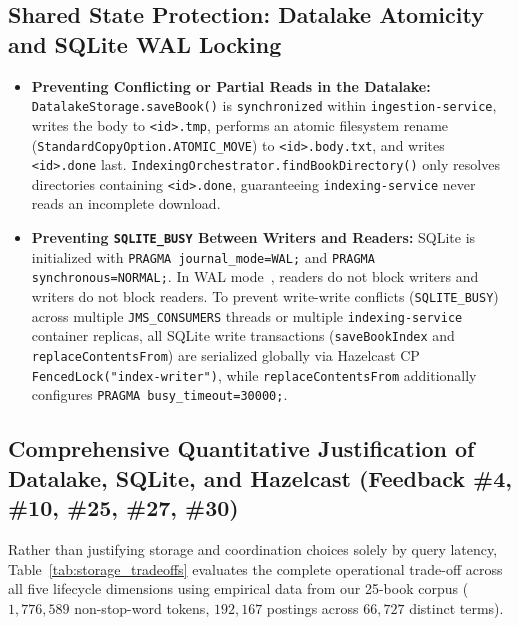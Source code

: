 \documentclass[10pt,a4paper]{article}
\begin{document}
\subsection{Shared State Protection: Datalake Atomicity and SQLite WAL Locking}
\begin{itemize}[leftmargin=*,nosep]
    \item \textbf{Preventing Conflicting or Partial Reads in the Datalake:} \texttt{DatalakeStorage.saveBook()} is \texttt{synchronized} within \texttt{ingestion-service}, writes the body to \texttt{<id>.tmp}, performs an atomic filesystem rename (\texttt{StandardCopyOption.ATOMIC\_MOVE}) to \texttt{<id>.body.txt}, and writes \texttt{<id>.done} last. \texttt{IndexingOrchestrator.findBookDirectory()} only resolves directories containing \texttt{<id>.done}, guaranteeing \texttt{indexing-service} never reads an incomplete download.
    \item \textbf{Preventing \texttt{SQLITE\_BUSY} Between Writers and Readers:} SQLite is initialized with \texttt{PRAGMA journal\_mode=WAL;} and \texttt{PRAGMA synchronous=NORMAL;}. In WAL mode~\cite{sqlite_wal_docs}, readers do not block writers and writers do not block readers. To prevent write-write conflicts (\texttt{SQLITE\_BUSY}) across multiple \texttt{JMS\_CONSUMERS} threads or multiple \texttt{indexing-service} container replicas, all SQLite write transactions (\texttt{saveBookIndex} and \texttt{replaceContentsFrom}) are serialized globally via Hazelcast CP \texttt{FencedLock("index-writer")}, while \texttt{replaceContentsFrom} additionally configures \texttt{PRAGMA busy\_timeout=30000;}.
\end{itemize}

\subsection{Comprehensive Quantitative Justification of Datalake, SQLite, and Hazelcast (Feedback \#4, \#10, \#25, \#27, \#30)}
Rather than justifying storage and coordination choices solely by query latency, Table~\ref{tab:storage_tradeoffs} evaluates the complete operational trade-off across all five lifecycle dimensions using empirical data from our 25-book corpus ($1,776,589$ non-stop-word tokens, $192,167$ postings across $66,727$ distinct terms).
\end{document}
